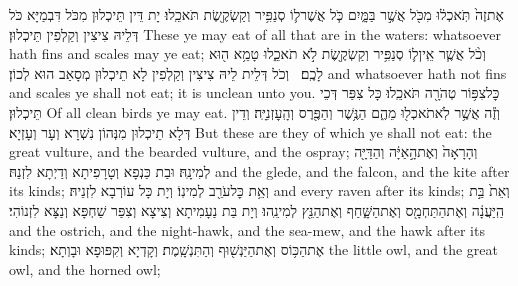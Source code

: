 {אֶת\maqqaf זֶה֙ תֹּֽאכְל֔וּ מִכֹּ֖ל אֲשֶׁ֣ר בַּמָּ֑יִם כֹּ֧ל אֲשֶׁר\maqqaf ל֛וֹ סְנַפִּ֥יר וְקַשְׂקֶ֖שֶׂת תֹּאכֵֽלוּ׃}
{יָת דֵּין תֵּיכְלוּן מִכֹּל דִּבְמַיָּא כֹּל דְּלֵיהּ צִיצִין וְקַלְפִין תֵּיכְלוּן׃}
{These ye may eat of all that are in the waters: whatsoever hath fins and scales may ye eat;}{}
{וְכֹ֨ל אֲשֶׁ֧ר אֵֽין\maqqaf ל֛וֹ סְנַפִּ֥יר וְקַשְׂקֶ֖שֶׂת לֹ֣א תֹאכֵ֑לוּ טָמֵ֥א ה֖וּא לָכֶֽם׃ \setuma }
{וְכֹל דְּלֵית לֵיהּ צִיצִין וְקַלְפִין לָא תֵיכְלוּן מְסָאַב הוּא לְכוֹן׃}
{and whatsoever hath not fins and scales ye shall not eat; it is unclean unto you.}{}
{כׇּל\maqqaf צִפּ֥וֹר טְהֹרָ֖ה תֹּאכֵֽלוּ׃}
{כָּל צִפַּר דְּכֵי תֵּיכְלוּן׃}
{Of all clean birds ye may eat.}{}
{וְזֶ֕ה אֲשֶׁ֥ר לֹֽא\maqqaf תֹאכְל֖וּ מֵהֶ֑ם הַנֶּ֥שֶׁר וְהַפֶּ֖רֶס וְהָֽעׇזְנִיָּֽה׃}
{וְדֵין דְּלָא תֵיכְלוּן מִנְּהוֹן נִשְׁרָא וְעָר וְעָזְיָא׃}
{But these are they of which ye shall not eat: the great vulture, and the bearded vulture, and the ospray;}{}
{וְהָרָאָה֙ וְאֶת\maqqaf הָ֣אַיָּ֔ה וְהַדַּיָּ֖ה לְמִינָֽהּ׃}
{וּבַת כַּנְפָא וְטָרָפִיתָא וְדַיְתָא לִזְנַהּ׃}
{and the glede, and the falcon, and the kite after its kinds;}{}
{וְאֵ֥ת כׇּל\maqqaf עֹרֵ֖ב לְמִינֽוֹ׃}
{וְיָת כָּל עוֹרְבָא לִזְנֵיהּ׃}
{and every raven after its kinds;}{}
{וְאֵת֙ בַּ֣ת הַֽיַּעֲנָ֔ה וְאֶת\maqqaf הַתַּחְמָ֖ס וְאֶת\maqqaf הַשָּׁ֑חַף וְאֶת\maqqaf הַנֵּ֖ץ לְמִינֵֽהוּ׃}
{וְיָת בַּת נַעָמִיתָא וְצִיצָא וְצִפַּר שַׁחְפָּא וְנַצָּא לִזְנוֹהִי׃}
{and the ostrich, and the night-hawk, and the sea-mew, and the hawk after its kinds;}{}
{אֶת\maqqaf הַכּ֥וֹס וְאֶת\maqqaf הַיַּנְשׁ֖וּף וְהַתִּנְשָֽׁמֶת׃}
{וְקָדְיָא וְקִפּוּפָא וּבָוְתָא׃}
{the little owl, and the great owl, and the horned owl;}{}
